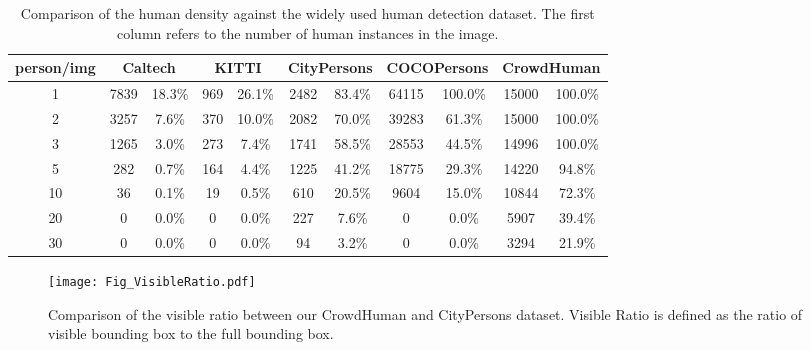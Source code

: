 \documentclass[10pt,twocolumn,letterpaper]{article}
\begin{document}
\begin{table*}
\begin{center}
\begin{tabular}{c|cc|cc|cc|cc|cc}
{person/img } & \multicolumn{2}{c}{Caltech} & \multicolumn{2}{c}{KITTI} & \multicolumn{2}{c}{CityPersons} & \multicolumn{2}{c}{COCOPersons} & \multicolumn{2}{c}{CrowdHuman} \\
\hline
{1} & {7839} & {18.3\%} & {969} & {26.1\%} & {2482} & {83.4\%} & {64115} & {100.0\%} & {15000} & {100.0\%} \\
{2} & {3257} & {7.6\%} & {370} & {10.0\%} & {2082} & {70.0\%} & {39283} & {61.3\%} & {15000} & {100.0\%} \\
{3} & {1265} & {3.0\%} & {273} & {7.4\%} & {1741} & {58.5\%} & {28553} & {44.5\%} & {14996} & {100.0\%} \\
{5} & {282} & {0.7\%} & {164} & {4.4\%} & {1225} & {41.2\%} & {18775} & {29.3\%} & {14220} & {94.8\%} \\
{10} & {36} & {0.1\%} & {19} & {0.5\%} & {610} & {20.5\%} & {9604} & {15.0\%} & {10844} & {72.3\%} \\
{20} & {0} & {0.0\%} & {0} & {0.0\%} & {227} & {7.6\%} & {0} & {0.0\%} & {5907} & {39.4\%} \\
{30} & {0} & {0.0\%} & {0} & {0.0\%} & {94} & {3.2\%} & {0} & {0.0\%} & {3294} & {21.9\%} \\
\end{tabular}
\caption{Comparison of the human density against the widely used human detection dataset. The first column refers to the number of human instances in the image. } \label{tab:density}
\end{center}
\end{table*}


\begin{figure*}
\centering
\texttt{[image: Fig\_VisibleRatio.pdf]}
\caption{Comparison of the visible ratio between our CrowdHuman and CityPersons dataset. Visible Ratio is defined as the ratio of visible bounding box to the full bounding box.}
\label{fig:visRatio}
\end{figure*}
\end{document}
